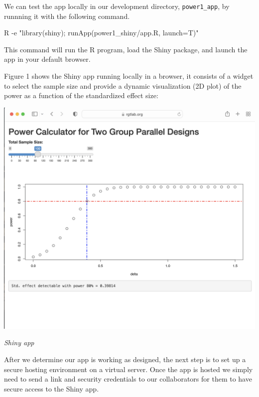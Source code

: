 \documentclass[
  letterpaper,
  DIV=11,
  numbers=noendperiod,
  oneside]{scrartcl}
\newenvironment{Shaded}{\begin{snugshade}}{\end{snugshade}}
\newcommand{\AttributeTok}[1]{\textcolor[rgb]{0.40,0.45,0.13}{#1}}
\newcommand{\ExtensionTok}[1]{\textcolor[rgb]{0.00,0.23,0.31}{#1}}
\newcommand{\StringTok}[1]{\textcolor[rgb]{0.13,0.47,0.30}{#1}}
\begin{document}
We can test the app locally in our development directory,
\texttt{power1\_app}, by runnning it with the following command.

\begin{Shaded}
\begin{Highlighting}[]
\ExtensionTok{R} \AttributeTok{{-}e} \StringTok{"library(shiny); runApp(\textquotesingle{}power1\_shiny/app.R\textquotesingle{}, launch=T)"}
\end{Highlighting}
\end{Shaded}

This command will run the R program, load the Shiny package, and launch
the app in your default browser.

Figure 1 shows the Shiny app running locally in a browser, it consists
of a widget to select the sample size and provide a dynamic
visualization (2D plot) of the power as a function of the standardized
effect size:

\begin{marginfigure}

{\centering \includegraphics{img/shinyapppower1.png}

}

\caption{\emph{Shiny app}}

\end{marginfigure}

After we determine our app is working as designed, the next step is to
set up a secure hosting environment on a virtual server. Once the app is
hosted we simply need to send a link and security credentials to our
collaborators for them to have secure access to the Shiny app.
\end{document}
